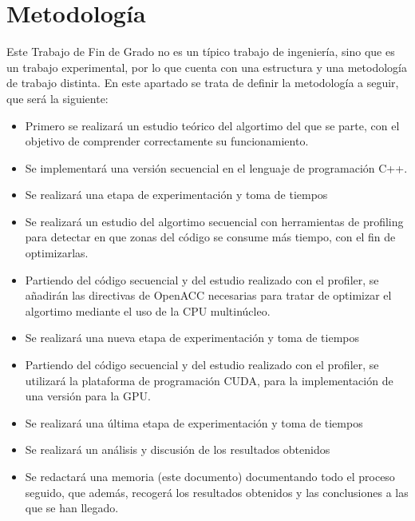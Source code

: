 \chapter{Metodología}

Este Trabajo de Fin de Grado no es un típico trabajo de ingeniería, sino que es un trabajo experimental, por lo que cuenta con una estructura y una metodología de trabajo distinta. En este apartado se trata de definir la metodología a seguir, que será la siguiente: \\

\begin{itemize}
    \item Primero se realizará un estudio teórico del algortimo del que se parte, con el objetivo de comprender correctamente su funcionamiento.
    \item Se implementará una versión secuencial en el lenguaje de programación C++.
    \item Se realizará una etapa de experimentación y toma de tiempos 
    \item Se realizará un estudio del algortimo secuencial con herramientas de profiling para detectar en que zonas del código se consume más tiempo, con el fin de optimizarlas.
    \item Partiendo del código secuencial y del estudio realizado con el profiler, se añadirán las directivas de OpenACC necesarias para tratar de optimizar el algortimo mediante el uso de la CPU multinúcleo.
    \item Se realizará una nueva etapa de experimentación y toma de tiempos
    \item Partiendo del código secuencial y del estudio realizado con el profiler, se utilizará la plataforma de programación CUDA, para la implementación de una versión para la GPU.
    \item Se realizará una última etapa de experimentación y toma de tiempos 
    \item Se realizará un análisis y discusión de los resultados obtenidos
    \item Se redactará una memoria (este documento) documentando todo el proceso seguido, que además, recogerá los resultados obtenidos y las conclusiones a las que se han llegado.
\end{itemize}
 
